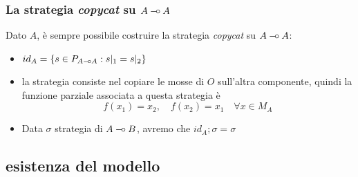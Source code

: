 \documentclass{beamer}
\newcommand{\limp}{\mathbin{{-}\mkern-3.5mu{\circ}}}
\begin{document}
\begin{frame}
{
	}		
			
\end{frame}


\begin{frame}

	\frametitle{La strategia \emph{copycat} su $A\limp A$}
Dato $A$, è sempre possibile costruire la strategia \emph{copycat} su $A\limp A$:

\begin{itemize}
 \item<2-> $id_A=\{s \in P_{A\limp A} : s|_1=s|_2 \}$ 
 \item<3-> la strategia consiste nel copiare le mosse di $O$ sull'altra componente, quindi la funzione parziale associata a questa strategia è
 \[
 f(x_1)=x_2, \quad f(x_2)=x_1 \quad \forall x \in M_A
 \]
 \item<4-> Data $\sigma$ strategia di $A\limp B$, avremo che $id_A;\sigma=\sigma$
\end{itemize}


\end{frame}


\subsection{esistenza del modello}
\end{document}
